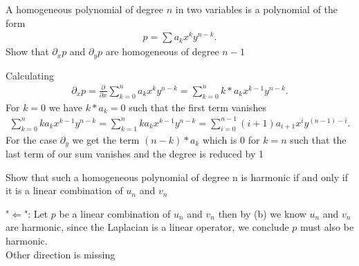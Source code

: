 \begin{solution}
\end{solution}
\begin{exercise}[c]
 A  homogeneous polynomial of degree $n$ in two variables is a polynomial of the form 
 \begin{align*}
  p = \sum a_k x^{k}y^{n-k}  
 .\end{align*}
 Show that $\partial_x p$ and $\partial_y p$ are homogeneous of degree $n-1$
\end{exercise}
\begin{solution}
  Calculating 
  \begin{align*}
    \partial_x p = \frac{\partial}{\partial x} \sum_{k=0}^{n}  a_k x^{k} y^{n-k}   = \sum_{k=0}^{n} k*a_kx^{k-1}y^{n-k}  
  .\end{align*}
  For $k=0$ we have $ k*a_k = 0$ such that the first term vanishes
  \begin{align*}
    \sum_{k=0}^{n} k a_k x^{k-1}y^{n-k} = \sum_{k=1}^{n} k a_k x^{k-1}y^{n-k} = \sum_{i=0}^{n-1} (i+1)a_{i+1}x^{i}y^{(n-1)-i}   
  .\end{align*}
  For the case $\partial_y$ we get the term $(n-k)*a_k$ which is 0 for $k=n$  such that the last term of our sum vanishes 
  and the degree is reduced by 1 \\[1ex]
\end{solution}
\begin{exercise}[d]
 Show that such a homogeneous polynomial of degree n is harmonic if and only if it is a linear combination of $u_n$  and $v_n$
\end{exercise}
\begin{solution}
 "$\Leftarrow$":  Let $p$ be a linear combination of $u_n$ and $v_n$ then by (b) we know $u_n$ and $v_n$ are harmonic, since 
 the Laplacian is a linear operator, we conclude $p$ must also be harmonic. \\[1ex]
 Other direction is missing
\end{solution}
